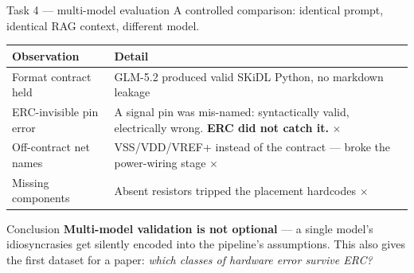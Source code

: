 \documentclass[aspectratio=169,10pt]{beamer}
\newcommand{\ok}{{\color{stgreen}\textbf{\checkmark}}}
\newcommand{\no}{{\color{stred}\textbf{$\times$}}}
\newcommand{\code}[1]{{\ttfamily\small #1}}
\begin{document}
\begin{frame}{Task 4 --- multi-model evaluation}
\vspace{0.5mm}
\small
A controlled comparison: identical prompt, identical RAG context, different model.
\vspace{1mm}
\begin{center}\small
\begin{tabular}{@{}p{} p{}@{}}
\toprule
\textbf{Observation} & \textbf{Detail}\\
\midrule
Format contract held & GLM-5.2 produced valid SKiDL Python, no markdown leakage \ok\\
\addlinespace
ERC-invisible pin error & A signal pin was mis-named: syntactically valid, electrically wrong. \textbf{ERC did not catch it.} \no\\
\addlinespace
Off-contract net names & \code{VSS}/\code{VDD}/\code{VREF+} instead of the contract --- broke the power-wiring stage \no\\
\addlinespace
Missing components & Absent resistors tripped the placement hardcodes \no\\
\bottomrule
\end{tabular}
\end{center}
\vspace{1mm}
\begin{block}{Conclusion}
\small
\textbf{Multi-model validation is not optional} --- a single model's idiosyncrasies get silently encoded into the pipeline's assumptions. This also gives the first dataset for a paper: \emph{which classes of hardware error survive ERC?}
\end{block}
\end{frame}
\end{document}
